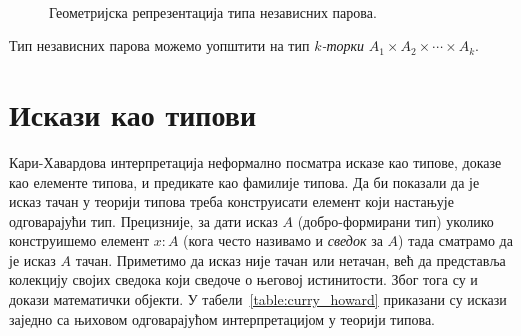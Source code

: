 \documentclass[12pt,oneside]{memoir}
\begin{document}
\begin{figure}[!ht]
    \centering\
    \label{fig:geo_sum}
    \caption{Геометријска репрезентација типа независних парова.}
\end{figure}

Тип независних парова можемо уопштити на тип \emph{$k$-торки} $A_1 \times A_2 \times \cdots \times A_k$.

\section{Искази као типови}

{\color{red}Кари-{}Хавардова} интерпретација неформално посматра исказе као типове, доказе као елементе типова, и предикате као фамилије типова. Да би показали да је исказ тачан у теорији типова треба конструисати елемент који настањује одговарајући тип. Прецизније, за дати исказ $A$ (добро-формирани тип) уколико конструишемо елемент $x : A$ (кога често називамо и \emph{сведок} за $A$) тада сматрамо да је исказ $A$ тачан. Приметимо да исказ није тачан или нетачан, већ да представља колекцију својих сведока који сведоче о његовој истинитости. Због тога су и докази математички објекти. У табели~\ref{table:curry_howard} приказани су искази заједно са њиховом одговарајућом интерпретацијом у теорији типова.
\end{document}
